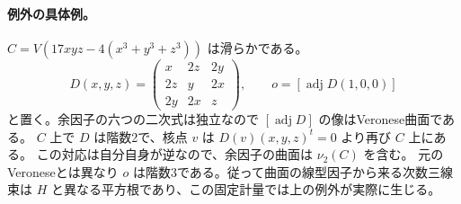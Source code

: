 \paragraph{例外の具体例。}
$C=V(17xyz-4(x^3+y^3+z^3))$ は滑らかである。
\[
 D(x,y,z)=\begin{pmatrix}x&2z&2y\\2z&y&2x\\2y&2x&z\end{pmatrix},
 \qquad o=[\operatorname{adj}D(1,0,0)]
\]
と置く。余因子の六つの二次式は独立なので $[\operatorname{adj}D]$ の像はVeronese曲面である。
$C$ 上で $D$ は階数2で、核点 $v$ は $D(v)(x,y,z)^t=0$ より再び $C$ 上にある。
この対応は自分自身が逆なので、余因子の曲面は $\nu_2(C)$ を含む。
元のVeroneseとは異なり $o$ は階数3である。従って曲面の線型因子から来る次数三線束は
$H$ と異なる平方根であり、この固定計量では上の例外が実際に生じる。
